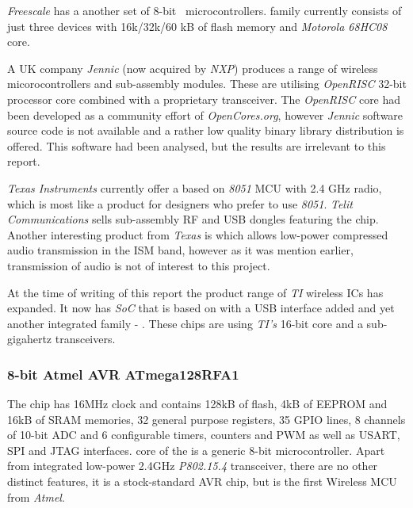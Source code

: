  \emph{Freescale} has a another set of 8-bit \WPAN\ microcontrollers.
  family currently consists of just three devices with
 16k/32k/60 kB of flash memory and \emph{Motorola 68HC08} core.

 A UK company \emph{Jennic} (now acquired by \emph{NXP}) produces a
 range of wireless micorocontrollers and sub-assembly modules. These
 are utilising \emph{OpenRISC} 32-bit processor core combined with a
 proprietary transceiver. The \emph{OpenRISC} core had been developed
 as a community effort of \emph{OpenCores.org}, however \emph{Jennic}
 software source code is not available and a rather low quality binary
 library distribution is offered. This software had been analysed, but
 the results are irrelevant to this report.

 \emph{Texas Instruments} currently offer a  based on
 \emph{8051} MCU with 2.4 GHz radio, which is most like a product for
 designers who prefer to use \emph{8051}. \emph{Telit Communications}
 sells sub-assembly RF and USB dongles featuring the  chip.
 Another interesting product from \emph{Texas} is  which
 allows low-power compressed audio transmission in the ISM band, however
 as it was mention earlier, transmission of audio is not of interest
 to this project.

 At the time of writing of this report the product range of \emph{TI}
 wireless ICs has expanded. It now has  \emph{SoC}
 that is based on  with a USB interface added and
 yet another integrated family - . These chips are using
 \emph{TI's}  16-bit core and a sub-gigahertz 
 transceivers.

\subsubsection{8-bit Atmel AVR ATmega128RFA1}

 The  \cite{atmel:atmega128rfa1:datasheet} chip
 has 16MHz clock and contains 128kB of flash, 4kB of EEPROM and 16kB
 of SRAM memories, 32 general purpose registers, 35 GPIO lines, 8
 channels of 10-bit ADC and 6 configurable timers, counters and PWM
 as well as USART, SPI and JTAG interfaces.  core
 of the  is a generic 8-bit microcontroller.
 Apart from integrated  \cite{atmel:at86rf231:datasheet}
 low-power 2.4GHz \emph{P802.15.4} transceiver, there are no other
 distinct features, it is a stock-standard AVR chip, but is the first
 Wireless MCU from \emph{Atmel}.

